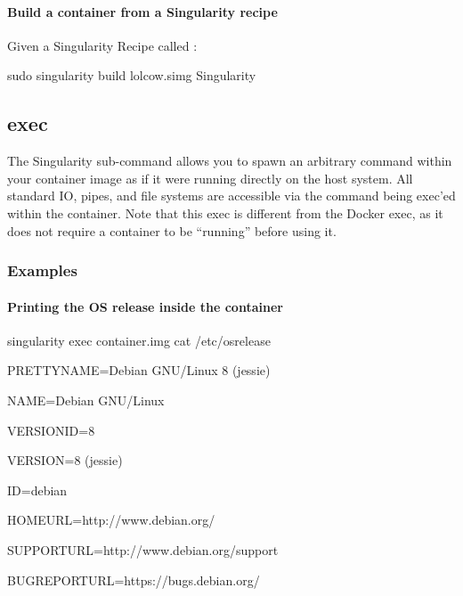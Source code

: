 \documentclass[letterpaper,10pt,english]{sphinxmanual}
\begin{document}
\paragraph{Build a container from a Singularity recipe}
\label{\detokenize{appendix:build-a-container-from-a-singularity-recipe}}
Given a Singularity Recipe called  :

%
\begin{sphinxVerbatim}[commandchars=\\\{\}]
\PYGZdl{} sudo singularity build lolcow.simg Singularity
\end{sphinxVerbatim}


\subsection{exec}
\label{\detokenize{appendix:exec}}\label{\detokenize{appendix:exec-command}}
The  Singularity sub-command allows you to spawn an arbitrary command
within your container image as if it were running directly on the host
system. All standard IO, pipes, and file systems are accessible via the
command being exec’ed within the container. Note that this exec is
different from the Docker exec, as it does not require a container to be
“running” before using it.


\subsubsection{Examples}
\label{\detokenize{appendix:id33}}

\paragraph{Printing the OS release inside the container}
\label{\detokenize{appendix:printing-the-os-release-inside-the-container}}
%
\begin{sphinxVerbatim}[commandchars=\\\{\}]
\PYGZdl{} singularity exec container.img cat /etc/os\PYGZhy{}release

PRETTY\PYGZus{}NAME=\PYGZdq{}Debian GNU/Linux 8 (jessie)\PYGZdq{}

NAME=\PYGZdq{}Debian GNU/Linux\PYGZdq{}

VERSION\PYGZus{}ID=\PYGZdq{}8\PYGZdq{}

VERSION=\PYGZdq{}8 (jessie)\PYGZdq{}

ID=debian

HOME\PYGZus{}URL=\PYGZdq{}http://www.debian.org/\PYGZdq{}

SUPPORT\PYGZus{}URL=\PYGZdq{}http://www.debian.org/support\PYGZdq{}

BUG\PYGZus{}REPORT\PYGZus{}URL=\PYGZdq{}https://bugs.debian.org/\PYGZdq{}

\PYGZdl{}
\end{sphinxVerbatim}
\end{document}

